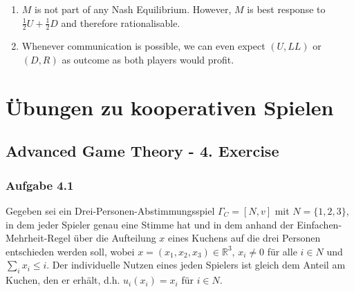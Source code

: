 \documentclass[12pt]{extreport} %
\theoremstyle{named}
\theoremstyle{itshape}
\theoremstyle{normal}
\begin{document}
\begin{enumerate}
\begin{proof}[Proof (Using the Proposition after the Definition of Mixed Strategy NE)]
\begin{itemize}
					\item For the remaining cases four cases the proof follows analogously; we find the necessary probability and show that deviation is enlarging the utility.
				\end{itemize}
			\end{proof}
	\item $M$ is not part of any Nash Equilibrium. However, $M$ is best response to $\frac{1}{2} U + \frac{1}{2}D$ and therefore rationalisable.
	\item Whenever communication is possible, we can even expect $(U, LL)$ or $(D, R)$ as outcome as both players would profit.
\end{enumerate}


\section{Übungen zu kooperativen Spielen}

\subsection*{Advanced Game Theory - 4. Exercise}

\subsubsection*{Aufgabe 4.1}

Gegeben sei ein Drei-Personen-Abstimmungsspiel $\Gamma_{C} = [N, v]$ mit $N = \{1, 2, 3\}$, in dem jeder Spieler genau eine Stimme hat und in dem anhand der Einfachen-Mehrheit-Regel über die Aufteilung $x$ eines Kuchens auf die drei Personen entschieden werden soll, wobei $x = (x_1, x_2, x_3) \in \mathbb{R}^{3}$, $x_i \neq 0$ für alle $i \in N$ und $\sum_{i} x_{i} \leq i$. Der individuelle Nutzen eines jeden Spielers ist gleich dem Anteil am Kuchen, den er erhält, d.h. $u_i(x_i) = x_i$ für $i \in N$.
\end{document}
